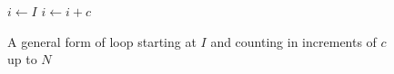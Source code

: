 \begin{figure}[H]
    \centering
    \begin{algorithmic}
            \State $i \gets I$
                \State {}
                \State $i \gets i + c$
            \EndWhile
        \EndFunction
    \end{algorithmic}
    \caption{A general form of loop starting at $I$ and counting in increments of $c$ up to $N$}
    \label{fig:impl:general-loop}
\end{figure}
